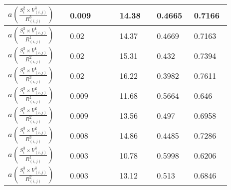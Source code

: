 \documentclass[10pt]{article}
\begin{document}
\begin{center}
\begin{table}[H]
\begin{center}
\begin{adjustbox}{width=0.5\textwidth}
\begin{tabular}{|p{0.25\linewidth}|p{0.2\linewidth}|p{0.15\linewidth}|p{0.15\linewidth}|p{0.15\linewidth}|}
\hline
 $a(  \frac{S_{i}^2 \times V_{(i,j)}^3}{R_{(i,j)}^3})$ & 0.009 & 14.38 & 0.4665 & 0.7166\\
\hline
 $a(  \frac{S_{i}^3 \times V_{(i,j)}^1}{R_{(i,j)}^1})$ & 0.02 & 14.37 & 0.4669 & 0.7163 \\
\hline
 $a(  \frac{S_{i}^3 \times V_{(i,j)}^1}{R_{(i,j)}^2})$ & 0.02 & 15.31 & 0.432 & 0.7394 \\
\hline
 $a(  \frac{S_{i}^3 \times V_{(i,j)}^1}{R_{(i,j)}^3})$ & 0.02 & 16.22 & 0.3982 & 0.7611 \\
\hline
$a(  \frac{S_{i}^3 \times V_{(i,j)}^2}{R_{(i,j)}^1})$ & 0.009 & 11.68 & 0.5664 & 0.646 \\
\hline
$a(  \frac{S_{i}^3 \times V_{(i,j)}^2}{R_{(i,j)}^2})$ & 0.009 & 13.56 & 0.497 & 0.6958\\
\hline
 $a(  \frac{S_{i}^3 \times V_{(i,j)}^2}{R_{(i,j)}^3})$ & 0.008 & 14.86 & 0.4485 & 0.7286 \\
\hline
 $a(  \frac{S_{i}^3 \times V_{(i,j)}^3}{R_{(i,j)}^1})$ & 0.003 & 10.78 & 0.5998 & 0.6206 \\
\hline
$a(  \frac{S_{i}^3 \times V_{(i,j)}^3}{R_{(i,j)}^2})$ & 0.003 & 13.12 & 0.513 & 0.6846 \\
\hline
\end{tabular}
\end{adjustbox}
\end{center}
\end{table}
\end{center} 
\end{document}
